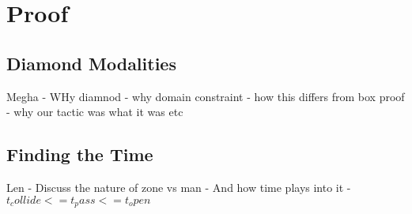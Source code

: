 \newpage


\section{Proof}

\subsection{Diamond Modalities}

Megha
- WHy diamnod 
- why domain constraint 
- how this differs from box proof 
- why our tactic was what it was etc

\subsection{Finding the Time}

Len
- Discuss the nature of zone vs man 
- And how time plays into it 
- $t_collide <= t_pass <= t_open $

\blindtext
